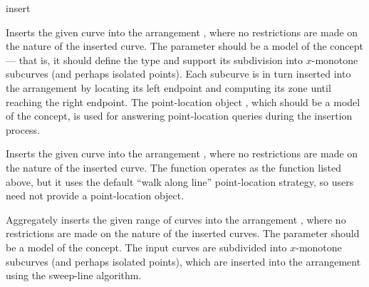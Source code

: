 
\ccRefPageBegin

\begin{ccRefFunction}{insert}


   {Inserts the given curve  into the arrangement , where
    no restrictions are made on the nature of the inserted curve.
    The  parameter should be a model of the
    concept --- that is, it should define the  type and support
    its subdivision into $x$-monotone subcurves (and perhaps isolated points).
    Each subcurve is in turn inserted into the arrangement by locating its
    left endpoint and computing its zone until reaching the right endpoint.
    The point-location object , which should be a model of the
     concept, is used for answering
    point-location queries during the insertion process.
    }

   {Inserts the given curve  into the arrangement , where
    no restrictions are made on the nature of the inserted curve.
    The function operates as the function listed above, but it uses the default
    ``walk along line'' point-location strategy, so users need not provide a
    point-location object.}

   {Aggregately inserts the given range of curves \ccc{[first,last)} into
    the arrangement , where no restrictions are made on the nature of
    the inserted curves. The  parameter should be a model of the
     concept. The input curves are subdivided into
    $x$-monotone subcurves (and perhaps isolated points), which are inserted
    into the arrangement using the sweep-line algorithm.
    }

\end{ccRefFunction}

\ccRefPageEnd
